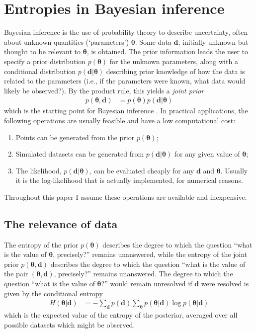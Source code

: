 \documentclass[entropy,article,accept,oneauthor,pdftex,10pt,a4paper]{mdpi}
\renewcommand{\d}{\boldsymbol{d}}
\newcommand{\x}{\boldsymbol{\theta}}
\begin{document}
\section{Entropies in Bayesian inference}

Bayesian inference is the use of probability theory to
describe uncertainty, often about unknown quantities
(`parameters') $\x$. Some data $\d$, initially unknown but
thought to be relevant to $\x$, is obtained.
The prior information leads the
user to specify a prior distribution $p(\x)$ for the unknown parameters,
along with a conditional distribution $p(\d | \x)$ describing prior knowledge
of how the data is related to the parameters
(i.e., if the parameters were known, what data would likely be observed?).
By the product rule, this yields a {\em joint prior}
\begin{align}
p(\x, \d) &= p(\x)p(\d | \x)
\end{align}
which is the starting point for
Bayesian inference \citep{caticha2008lectures, caticha2006updating}.
In practical applications, the following operations
are usually feasible and have a low computational cost:
\begin{enumerate}
  \item Points can be generated from the prior $p(\x)$;
  \item Simulated datasets can be generated from $p(\d | \x)$ for any
        given value of $\x$;
  \item The likelihood, $p(\d | \x)$, can be evaluated cheaply for any
        $\d$ and $\x$. Usually it is the log-likelihood that is actually
        implemented, for numerical reasons.
\end{enumerate}
Throughout this paper I assume these operations are available and inexpensive.

\subsection{The relevance of data}

The entropy of the prior $p(\x)$ describes the degree to which the question
``what is the value of $\x$, precisely?'' remains unanswered, while the
entropy of the joint prior $p(\x, \d)$
describes the degree to which the question
``what is the value of the pair $(\x, \d)$, precisely?'' remains unanswered.
The degree to which the question ``what is the value of $\x$?'' would remain
unresolved if $\d$ were resolved is given by the
conditional entropy
\begin{align}
H(\x | \d) &= - \sum_{\d} p(\d) \sum_{\x} p(\x | \d) \log p(\x | \d)
\end{align}
which is the expected value of the entropy of the posterior, averaged over
all possible datasets which might be observed. 
\end{document}

